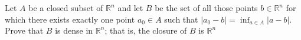 Let \(A\) be a closed subset of \(\mathbb{R}^{n}\) and let \(B\) be the set of all those points \(b \in \mathbb{R}^{n}\) for which there exists exactly one point \(a_{0}\in A \) such that \(|a_{0}-b|= \inf_{a\in A}|a-b|\).
Prove that \(B\) is dense in \(\mathbb{R}^{n}\);  that is, the closure of \(B\) is \(\mathbb{R}^{n}\)